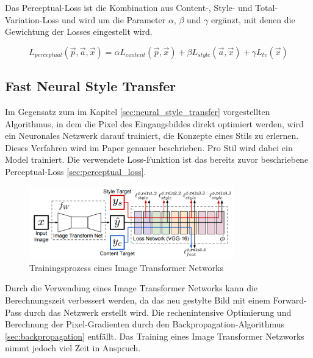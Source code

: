 Das Perceptual-Loss ist die Kombination aus Content-, Style- und Total-Variation-Loss und wird um die Parameter $ \alpha $, $ \beta $ und $ \gamma $ ergänzt, mit denen die Gewichtung der Losses eingestellt wird.

\begin{equation}
	\label{eq:perceptual_loss}
    L_{perceptual} ( \vec{p}, \vec{a}, \vec{x} ) = \alpha L_{content} ( \vec{p}, \vec{x} ) + \beta L_{style} ( \vec{a}, \vec{x} ) + \gamma L_{tv} ( \vec{x} )
\end{equation}

\subsection{Fast Neural Style Transfer}
\label{sec:fast_neural_style_transfer}

Im Gegensatz zum im Kapitel \ref{sec:neural_style_transfer} vorgestellten Algorithmus, in dem die Pixel des Eingangsbildes direkt optimiert werden, wird ein Neuronales Netzwerk darauf trainiert, die Konzepte eines Stils zu erlernen. Dieses Verfahren wird im Paper \cite{DBLP:journals/corr/JohnsonAL16} genauer beschrieben. Pro Stil wird dabei ein Model trainiert. Die verwendete Loss-Funktion ist das bereits zuvor beschriebene Perceptual-Loss \ref{sec:perceptual_loss}.

\begin{figure}[H]
	\centering
	\includegraphics[width=0.79\textwidth]{resources/content/fast_neural_style.png}
	\caption{Trainingsprozess eines Image Transformer Networks \cite{DBLP:journals/corr/JohnsonAL16}}
	\label{img:fast_neural_style_transfer}
\end{figure}

Durch die Verwendung eines Image Transformer Networks kann die Berechnungszeit verbessert werden, da das neu gestylte Bild mit einem Forward-Pass durch das Netzwerk erstellt wird. Die rechenintensive Optimierung und Berechnung der Pixel-Gradienten durch den Backpropagation-Algorithmus \ref{sec:backpropagation} entfällt. Das Training eines Image Transformer Netzworks nimmt jedoch viel Zeit in Anspruch.